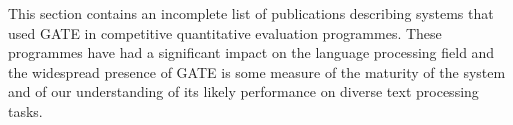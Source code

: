 
This section contains an incomplete list of publications describing systems that
used GATE in competitive quantitative evaluation programmes. These programmes
have had a significant impact on the language processing field and the widespread
presence of GATE is some measure of the maturity of the system and of our
understanding of its likely performance on diverse text processing tasks.



